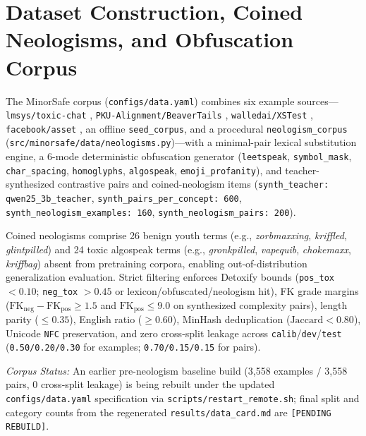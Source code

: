 \documentclass[11pt,letterpaper]{article}
\begin{document}
\section{Dataset Construction, Coined Neologisms, and Obfuscation Corpus}

The MinorSafe corpus (\texttt{configs/data.yaml}) combines six example sources---\texttt{lmsys/toxic-chat} \citep{lin2023toxicchat}, \texttt{PKU-Alignment/BeaverTails} \citep{ji2023beavertails}, \texttt{walledai/XSTest} \citep{rottger2024xstest}, \texttt{facebook/asset} \citep{alva2020asset}, an offline \texttt{seed\_corpus}, and a procedural \texttt{neologism\_corpus} (\texttt{src/minorsafe/data/neologisms.py})---with a minimal-pair lexical substitution engine, a 6-mode deterministic obfuscation generator (\texttt{leetspeak}, \texttt{symbol\_mask}, \texttt{char\_spacing}, \texttt{homoglyphs}, \texttt{algospeak}, \texttt{emoji\_profanity}), and teacher-synthesized contrastive pairs and coined-neologism items (\texttt{synth\_teacher: qwen25\_3b\_teacher}, \texttt{synth\_pairs\_per\_concept: 600}, \texttt{synth\_neologism\_examples: 160}, \texttt{synth\_neologism\_pairs: 200}).

Coined neologisms comprise 26 benign youth terms (e.g., \textit{zorbmaxxing}, \textit{kriffled}, \textit{glintpilled}) and 24 toxic algospeak terms (e.g., \textit{gronkpilled}, \textit{vapequib}, \textit{chokemaxx}, \textit{kriffbag}) absent from pretraining corpora, enabling out-of-distribution generalization evaluation. Strict filtering enforces Detoxify bounds (\texttt{pos\_tox} $< 0.10$; \texttt{neg\_tox} $> 0.45$ or lexicon/obfuscated/neologism hit), FK grade margins ($\text{FK}_{\text{neg}} - \text{FK}_{\text{pos}} \ge 1.5$ and $\text{FK}_{\text{pos}} \le 9.0$ on synthesized complexity pairs), length parity ($\le 0.35$), English ratio ($\ge 0.60$), MinHash deduplication ($\text{Jaccard} < 0.80$), Unicode \texttt{NFC} preservation, and zero cross-split leakage across \texttt{calib}/\texttt{dev}/\texttt{test} (\texttt{0.50/0.20/0.30} for examples; \texttt{0.70/0.15/0.15} for pairs).

\textit{Corpus Status:} An earlier pre-neologism baseline build (3,558 examples / 3,558 pairs, 0 cross-split leakage) is being rebuilt under the updated \texttt{configs/data.yaml} specification via \texttt{scripts/restart\_remote.sh}; final split and category counts from the regenerated \texttt{results/data\_card.md} are \texttt{[PENDING REBUILD]}.
\end{document}
